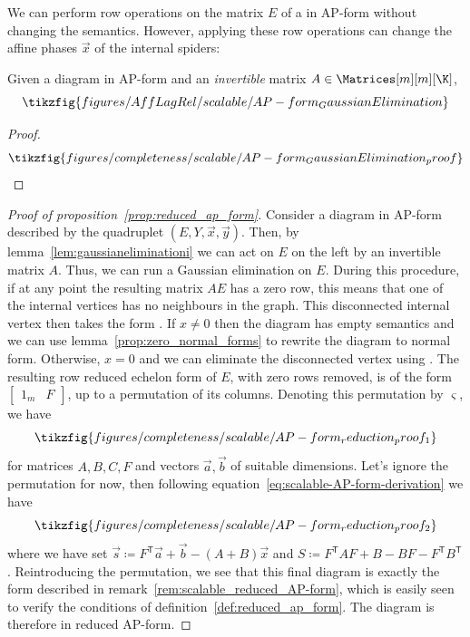 We can perform row operations on the matrix \(E\) of a
\diagram in AP-form without changing the semantics.  However, applying these row operations can change the affine phases
\(\vec{x}\) of the internal spiders:
\begin{lemma}
  \label{lem:gaussianeliminationi}
  Given a diagram in AP-form and an \emph{invertible} matrix \(A \in
  \Matrices[m][m][\K]\),
  \[
    \tikzfig{figures/AffLagRel/scalable/AP-form_GaussianElimination}
  \]
\end{lemma}
\begin{proof}
  \begin{equation}
    \tikzfig{figures/completeness/scalable/AP-form_GaussianElimination_proof}
  \end{equation}
\end{proof}
\begin{proof}[Proof of proposition~\ref{prop:reduced_ap_form}]
  Consider a diagram in AP-form described by the quadruplet
  \((E,Y,\vec{x},\vec{y})\). Then, by lemma~\ref{lem:gaussianeliminationi}
  we can act on \(E\) on the left by an invertible matrix \(A\). Thus,
  we can run a Gaussian elimination on \(E\). During this procedure,
  if at any point the resulting matrix \(AE\) has a zero row,
  this means that one of the internal vertices has no neighbours in
  the graph. This disconnected internal vertex then takes the form
  . If
  \(x \neq 0\)  then the diagram has empty semantics and we can use
  lemma~\ref{prop:zero_normal_forms} to rewrite the diagram to normal
  form. Otherwise, \(x=0\) and we can eliminate the disconnected vertex
  using \TextOne.
 The resulting row reduced echelon form of \(E\), with zero rows removed,
 is of the form \(\begin{bmatrix} 1_m & F \end{bmatrix}\), up to a permutation
 of its columns. Denoting this permutation by \(\varsigma\), we have
 \begin{equation}
   \tikzfig{figures/completeness/scalable/AP-form_reduction_proof_1}
 \end{equation}
 for matrices \(A,B,C,F\) and vectors \(\vec{a},\vec{b}\) of suitable
 dimensions. Let's ignore the permutation for now, then following
 equation~\eqref{eq:scalable-AP-form-derivation} we have
 \begin{equation}
   \tikzfig{figures/completeness/scalable/AP-form_reduction_proof_2}
 \end{equation}
 where we have set \(\vec{s} \coloneqq F^\mathsf{T}\vec{a} +
 \vec{b} -  (A+B) \vec{x}\) and \(S \coloneqq F^\mathsf{T}AF + B -
 BF - F^\mathsf{T}B^\mathsf{T}\).  Reintroducing the permutation,
 we see that this final diagram is exactly the form described in
 remark~\ref{rem:scalable_reduced_AP-form}, which is easily seen to verify the
 conditions of definition~\ref{def:reduced_ap_form}. The diagram is therefore
 in reduced AP-form.
\end{proof}
